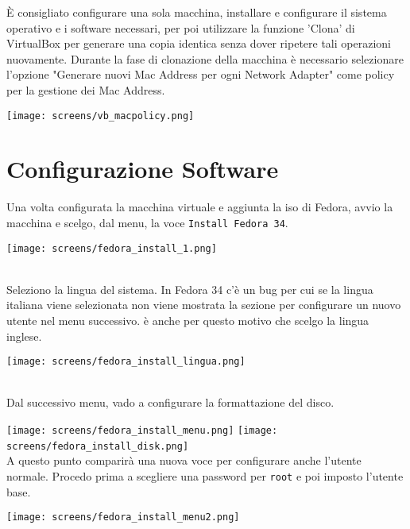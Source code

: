 \`{E} consigliato configurare una sola macchina, installare e configurare il sistema operativo e i software necessari, per poi utilizzare la funzione 'Clona' di VirtualBox per generare una copia identica senza dover ripetere tali operazioni nuovamente. Durante la fase di clonazione della macchina \`{e} necessario selezionare l'opzione "Generare nuovi Mac Address per ogni Network Adapter" come policy per la gestione dei Mac Address.

\begin{center}
	\texttt{[image: screens/vb\_macpolicy.png]}
\end{center}
 
\section{Configurazione Software}

Una volta configurata la macchina virtuale e aggiunta la iso di Fedora, avvio la macchina e scelgo, dal menu, la voce \lstinline[style=cmd]|Install Fedora 34|.

\begin{center}
	\texttt{[image: screens/fedora\_install\_1.png]}
\end{center}
\ \\
Seleziono la lingua del sistema. In Fedora  34 c'\`{e} un bug per cui se la lingua italiana viene selezionata non viene mostrata la sezione per configurare un nuovo utente nel menu successivo. \`{e} anche per questo motivo che scelgo la lingua inglese.

\begin{center}
	\texttt{[image: screens/fedora\_install\_lingua.png]}
\end{center}
\ \\
Dal successivo menu, vado a configurare la formattazione del disco.

\texttt{[image: screens/fedora\_install\_menu.png]}
\texttt{[image: screens/fedora\_install\_disk.png]}
\ \\
A questo punto comparir\`{a} una nuova voce per configurare anche l'utente normale. Procedo prima a scegliere una password per \lstinline[style=cmd]|root| e poi imposto l'utente base.

\begin{center}
	\texttt{[image: screens/fedora\_install\_menu2.png]}
\end{center}

